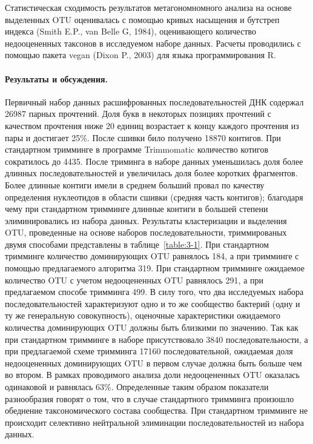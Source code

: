 \documentclass[a4paper,12pt,openany,final]{extreport}
\begin{document}
Статистическая сходимость результатов метагономномного анализа на основе
выделенных OTU оценивалась с помощью кривых насыщения и бутстреп индекса
(Smith E.P., van Belle G, 1984), оценивающего количество недооцененных
таксонов в исследуемом наборе данных. Расчеты проводились с помощью
пакета vegan (Dixon P., 2003) для языка программирования R.

\paragraph{Результаты и обсуждения.} Первичный набор данных
расшифрованных последовательностей ДНК содержал 26987 парных прочтений.
Доля букв в некоторых позициях прочтений с качеством прочтения ниже 20
единиц возрастает к концу каждого прочтения из пары и достигает 25\%.
После сшивки било получено 18870 контигов. При стандартном тримминге в
программе Trimmomatic количество котигов сократилось до 4435. После
триминга в наборе данных уменьшилась доля более длинных
последовательностей и увеличилась доля более коротких фрагментов. Более
длинные контиги имели в среднем больший провал по качеству определения
нуклеотидов в области сшивки (средняя часть контигов); благодаря чему
при стандартном тримминге длинные контиги в большей степени
элиминировались из набора данных. Результаты кластеризации и выделения
OTU, проведенные на основе наборов последовательности, триммированых
двумя способами представлены в таблице~\ref{table:3-1}. При стандартном тримминге
количество доминирующих OTU равнялось 184, а при тримминге с помощью
предлагаемого алгоритма 319. При стандартном тримминге ожидаемое
количество OTU с учетом недооцененных OTU равнялось 291, а при
предлагаемом способе тримминга 499. В силу того, что два исследуемых
набора последовательностей характеризуют одно и то же сообщество
бактерий (одну и ту же генеральную совокупность), оценочные
характеристики ожидаемого количества доминирующих OTU должны быть
близкими по значению. Так как при стандартном тримминге в наборе
присутствовало 3840 последовательности, а при предлагаемой схеме
тримминга 17160 последовательной, ожидаемая доля недооцененных
доминирующих OTU в первом случае должна быть больше чем во втором. В
рамках проводимого анализа доли недооцененных OTU оказалась одинаковой и
равнялась 63\%. Определенные таким образом показатели разнообразия
говорят о том, что в случае стандартного тримминга произошло обеднение
таксономического состава сообщества. При стандартном тримминге не
происходит селективно нейтральной элиминации последовательностей из
набора данных.
\end{document}
